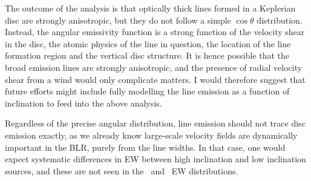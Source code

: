 The outcome of the \cite{hornemarsh1986} analysis is that optically thick lines 
formed in a Keplerian disc are strongly anisotropic, but they do not follow a simple 
$\cos \theta$ distribution. Instead, the angular emissivity function is
a strong function of the velocity shear in the disc, the atomic physics of
the line in question, the location of the line formation region 
and the vertical disc structure. It is hence possible
that the broad emission lines are strongly anisotropic, and the presence of radial
velocity shear from a wind would only complicate matters. 
I would therefore suggest that future efforts might include fully modelling 
the line emission as a function of inclination to feed into the above analysis.

Regardless of the precise angular distribution, 
line emission should not trace disc emission
exactly, as we already know large-scale velocity fields are dynamically important
in the BLR, purely from the line widths. In that case, one would expect systematic
differences in EW between high inclination and low inclination sources, and these are 
not seen in the \civline\ and \mgline\ EW distributions.

